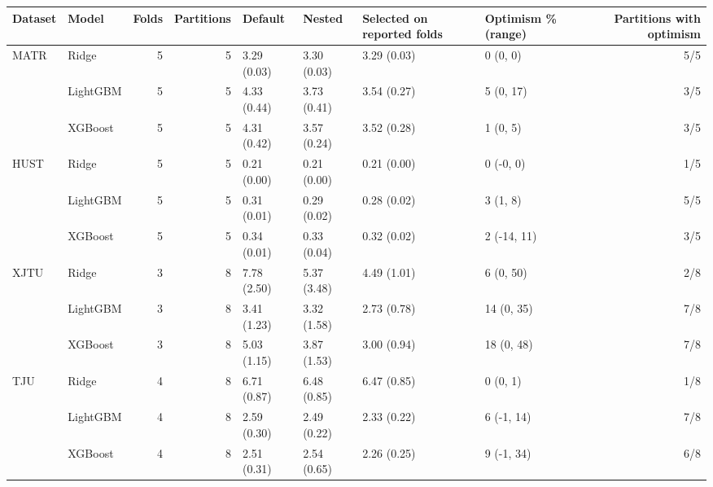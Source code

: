 \begin{tabular}{llrrllllr}
\toprule
Dataset & Model & Folds & Partitions & Default & Nested & Selected on reported folds & Optimism \% (range) & Partitions with optimism \\
\midrule
MATR & Ridge & 5 & 5 & 3.29 (0.03) & 3.30 (0.03) & 3.29 (0.03) & 0 (0, 0) & 5/5 \\
 & LightGBM & 5 & 5 & 4.33 (0.44) & 3.73 (0.41) & 3.54 (0.27) & 5 (0, 17) & 3/5 \\
 & XGBoost & 5 & 5 & 4.31 (0.42) & 3.57 (0.24) & 3.52 (0.28) & 1 (0, 5) & 3/5 \\
HUST & Ridge & 5 & 5 & 0.21 (0.00) & 0.21 (0.00) & 0.21 (0.00) & 0 (-0, 0) & 1/5 \\
 & LightGBM & 5 & 5 & 0.31 (0.01) & 0.29 (0.02) & 0.28 (0.02) & 3 (1, 8) & 5/5 \\
 & XGBoost & 5 & 5 & 0.34 (0.01) & 0.33 (0.04) & 0.32 (0.02) & 2 (-14, 11) & 3/5 \\
XJTU & Ridge & 3 & 8 & 7.78 (2.50) & 5.37 (3.48) & 4.49 (1.01) & 6 (0, 50) & 2/8 \\
 & LightGBM & 3 & 8 & 3.41 (1.23) & 3.32 (1.58) & 2.73 (0.78) & 14 (0, 35) & 7/8 \\
 & XGBoost & 3 & 8 & 5.03 (1.15) & 3.87 (1.53) & 3.00 (0.94) & 18 (0, 48) & 7/8 \\
TJU & Ridge & 4 & 8 & 6.71 (0.87) & 6.48 (0.85) & 6.47 (0.85) & 0 (0, 1) & 1/8 \\
 & LightGBM & 4 & 8 & 2.59 (0.30) & 2.49 (0.22) & 2.33 (0.22) & 6 (-1, 14) & 7/8 \\
 & XGBoost & 4 & 8 & 2.51 (0.31) & 2.54 (0.65) & 2.26 (0.25) & 9 (-1, 34) & 6/8 \\
\bottomrule
\end{tabular}
